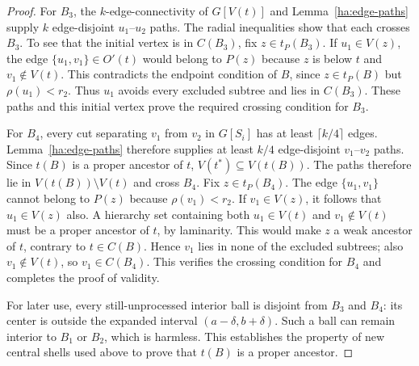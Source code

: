 \begin{proof}
For $B_3$, the $k$-edge-connectivity of $G[V(t)]$ and
Lemma~\ref{ha:edge-paths} supply $k$ edge-disjoint $u_1$--$u_2$ paths.
The radial inequalities show that
each crosses $B_3$.  To see that the initial vertex is in $C(B_3)$,
fix $z\in t_P(B_3)$.  If $u_1\in V(z)$, the edge
$\{u_1,v_1\}\in O'(t)$ would belong to $P(z)$ because $z$ is below
$t$ and $v_1\notin V(t)$.  This contradicts the endpoint condition of
$B$, since $z\in t_P(B)$ but $\rho(u_1)<r_2$.  Thus $u_1$ avoids
every excluded subtree and lies in $C(B_3)$.  These paths and this
initial vertex prove the required crossing condition for $B_3$.

For $B_4$, every cut separating $v_1$ from $v_2$ in $G[S_i]$ has
at least $\lceil k/4\rceil$ edges.  Lemma~\ref{ha:edge-paths}
therefore supplies at least $k/4$ edge-disjoint $v_1$--$v_2$ paths.
Since $t(B)$ is a proper
ancestor of $t$, $V(t^*)\subseteq V(t(B))$.  The paths therefore lie
in $V(t(B))\setminus V(t)$ and cross $B_4$.  Fix $z\in t_P(B_4)$.
The edge $\{u_1,v_1\}$ cannot belong to $P(z)$ because
$\rho(v_1)<r_2$.  If $v_1\in V(z)$, it follows that $u_1\in V(z)$
also.  A hierarchy set containing both $u_1\in V(t)$ and
$v_1\notin V(t)$ must be a proper ancestor of $t$, by laminarity.
This would make $z$ a weak ancestor of $t$, contrary to $t\in C(B)$.
Hence $v_1$ lies in none of the excluded subtrees; also
$v_1\notin V(t)$, so $v_1\in C(B_4)$.  This verifies the crossing
condition for $B_4$ and completes the proof of validity.

For later use, every still-unprocessed interior ball is disjoint from
$B_3$ and $B_4$: its center is outside the expanded interval
$(a-\delta,b+\delta)$.  Such a ball can remain interior to $B_1$ or
$B_2$, which is harmless.  This establishes the property of new
central shells used above to prove that $t(B)$ is a proper ancestor.


\end{proof}
